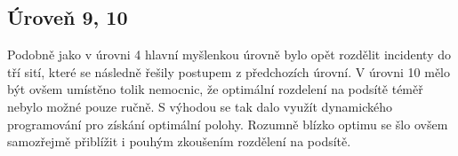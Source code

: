 \documentclass[12pt,a4paper]{article}
\begin{document}
\subsection*{Úroveň 9, 10}
Podobně jako v úrovni 4 hlavní myšlenkou úrovně bylo opět rozdělit incidenty do tří sití, které se následně řešily postupem z předchozích úrovní. V úrovni 10 mělo být ovšem umístěno tolik nemocnic, že optimální rozdelení na podsítě téměř nebylo možné pouze ručně. S výhodou se tak dalo využít dynamického programování pro získání optimální polohy. Rozumně blízko optimu se šlo ovšem samozřejmě přiblížit i pouhým zkoušením rozdělení na podsítě.
\end{document}
